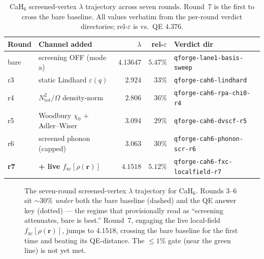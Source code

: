 \documentclass[11pt,a4paper]{article}
\begin{document}
\begin{table}[h]
\centering
\caption{CaH$_6$ screened-vertex $\lambda$ trajectory across seven rounds.
Round~7 is the first to cross the bare baseline. All values verbatim from
the per-round verdict directories; rel-$\varepsilon$ is vs.\ QE $4.376$.}
\label{tab:traj}
\begin{tabular}{l l r r l}
\toprule
Round & Channel added & $\lambda$ & rel-$\varepsilon$ & Verdict dir \\
\midrule
bare & screening OFF (mode a) & $4.13647$ & $5.47\%$ & \texttt{qforge-lane1-basis-sweep} \\
r3 & static Lindhard $\varepsilon(q)$ & $2.924$ & $33\%$ & \texttt{qforge-cah6-lindhard} \\
r4 & $N_{\mathrm{tot}}^2/\Omega$ density-norm & $2.806$ & $36\%$ & \texttt{qforge-cah6-rpa-chi0-r4} \\
r5 & Woodbury $\chi_0$ + Adler--Wiser & $3.094$ & $29\%$ & \texttt{qforge-cah6-dvscf-r5} \\
r6 & screened phonon (capped) & $3.063$ & $30\%$ & \texttt{qforge-cah6-phonon-scr-r6} \\
\textbf{r7} & \textbf{+ live $f_{\mathrm{xc}}[\rho(\mathbf{r})]$} & $\mathbf{4.1518}$ & $\mathbf{5.12\%}$ & \texttt{qforge-cah6-fxc-localfield-r7} \\
\bottomrule
\end{tabular}
\end{table}

\begin{figure}[h]
\centering
{}
\caption{The seven-round screened-vertex $\lambda$ trajectory for CaH$_6$.
Rounds 3--6 sit $\sim\!30\%$ \emph{under} both the bare baseline (dashed) and
the QE answer key (dotted) --- the regime that provisionally read as
``screening attenuates, bare is best.'' Round~7, engaging the live local-field
$f_{\mathrm{xc}}[\rho(\mathbf{r})]$, jumps to $4.1518$, crossing the bare
baseline for the first time and beating its QE-distance. The $\le\!1\%$ gate
(near the green line) is not yet met.}
\label{fig:traj}
\end{figure}
\end{document}
